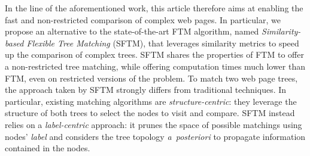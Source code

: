 



In the line of the aforementioned work, this article therefore aims at enabling the fast and non-restricted comparison of complex web pages.
In particular, we propose an alternative to the state-of-the-art FTM algorithm, named \emph{Similarity-based Flexible Tree Matching} (SFTM), that leverages similarity metrics to speed up the comparison of complex trees. 
SFTM shares the properties of FTM to offer a non-restricted tree matching, while offering computation times much lower than FTM, even on restricted versions of the problem.
To match two web page trees, the approach taken by SFTM strongly differs from traditional techniques.
In particular, existing matching algorithms are \textit{structure-centric}: they leverage the structure of both trees to select the nodes to visit and compare.
SFTM instead relies on a \textit{label-centric} approach: it prunes the space of possible matchings using nodes' \emph{label} and considers the tree topology \emph{a~posteriori} to propagate information contained in the nodes.

